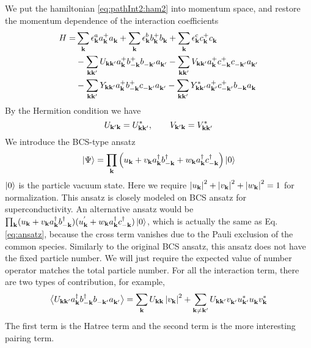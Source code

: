 We put the hamiltonian \ref{eq:pathInt2:ham2} into momentum space, and restore the momentum dependence of the interaction coefficients
\begin{equation}\label{eq:uvw:hamiltonian}
\begin{split}
 H=&\sum_{\mathbf{k}}\epsilon^a_{\mathbf{k}}{}a^+_{\mathbf{k}}{}a^{}_{\mathbf{k}}+\sum_{\mathbf{k}}\epsilon^b_{\mathbf{k}}{}b^+_{\mathbf{k}}{}b^{}_{\mathbf{k}}+\sum_{\mathbf{k}}\epsilon^c_{\mathbf{k}}{}c^+_{\mathbf{k}}{}c^{}_{\mathbf{k}}\\
  &-\sum_{\mathbf{k}\mathbf{k}'}U_{\mathbf{k}\mathbf{k}'}a^+_{\mathbf{k}}{}b^+_{-\mathbf{k}}{}b^{}_{-\mathbf{k}'}a^{}_{\mathbf{k}'}
	-\sum_{\mathbf{k}\mathbf{k}'}V_{\mathbf{k}\mathbf{k}'}a^+_{\mathbf{k}}{}c^+_{-\mathbf{k}}{}c^{}_{-\mathbf{k}'}a^{}_{\mathbf{k}'}\\
 &-\sum_{\mathbf{k}\mathbf{k}'}Y_{\mathbf{k}\mathbf{k}'}a^+_{\mathbf{k}}{}b^+_{-\mathbf{k}}{}c^{}_{-\mathbf{k}'}a^{}_{\mathbf{k}'}
	-\sum_{\mathbf{k}\mathbf{k}'}Y^*_{\mathbf{k}\mathbf{k}'}a^+_{\mathbf{k}'}{}c^+_{-\mathbf{k}'}{}b^{}_{-\mathbf{k}}a^{}_{\mathbf{k}}
\end{split} 
\end{equation}
By the Hermition condition we have 
\begin{equation}
 U_{\mathbf{k}'\mathbf{k}}=U^*_{\mathbf{k}\mathbf{k}'},\qquad{} V_{\mathbf{k}'\mathbf{k}}=V^*_{\mathbf{k}\mathbf{k}'}
\end{equation}
  We introduce the BCS-type ansatz 
\begin{equation}\label{eq:ansatz}
 \left|\Psi\right>=\prod_{\mathbf{k}}\left(u_{\mathbf{k}}+v_{\mathbf{k}}{}a^{\dagger}_{\mathbf{k}}{}b^{\dagger}_{-\mathbf{k}}+w_{\mathbf{k}}{}a^{\dagger}_{\mathbf{k}}{}c^{\dagger}_{-\mathbf{k}}\right)\left|0\right>
\end{equation}
$\left|0\right>$ is the particle vacuum state.  Here we require $\left\lvert{u_{\ensuremath{\mathbf{k}}}}\right\rvert^2+\left\lvert{v_{\ensuremath{\mathbf{k}}}}\right\rvert^2+\left\lvert{w_{\ensuremath{\mathbf{k}}}}\right\rvert^2=1$ for normalization.  This ansatz is closely modeled on BCS ansatz for superconductivity.  An alternative ansatz would be $\prod_{\mathbf{k}}(u_{\mathbf{k}}+v_{\mathbf{k}}{}a^{\dagger}_{\mathbf{k}}{}b^{\dagger}_{-\mathbf{k}})(u^{'}_{\mathbf{k}}+w_{\mathbf{k}}{}a^{\dagger}_{\mathbf{k}}{}c^{\dagger}_{-\mathbf{k}})\left|0\right>$, which is actually the same as Eq. \ref{eq:ansatz}, because  the cross term vanishes due to the Pauli exclusion of the common species.   Similarly to the original BCS ansatz, this ansatz does not have the fixed particle number.  We  will just require the expected value of number operator matches the total particle number. For all the interaction term, there are two types of contribution,
for example, 
\begin{equation*}
\bigl<{U_{\mathbf{k}\mathbf{k}'}a^{\dagger}_{\mathbf{k}}{}b^{\dagger}_{-\mathbf{k}}{}b^{}_{-\mathbf{k}'}a^{}_{\mathbf{k}'}}\bigr>
=\sum_{\mathbf{k}}U_{\mathbf{k}\mathbf{k}}\left\lvert{v_{\ensuremath{\mathbf{k}}}}\right\rvert^2+\sum_{\mathbf{k}\neq\mathbf{k}'}U_{\mathbf{k}\mathbf{k}'}v^{}_{\mathbf{k}'}u^*_{\mathbf{k}'}u^{}_{\mathbf{k}}{}v^*_{\mathbf{k}}
\end{equation*}
The first term is the Hatree term and the second term is the more interesting pairing term.  


